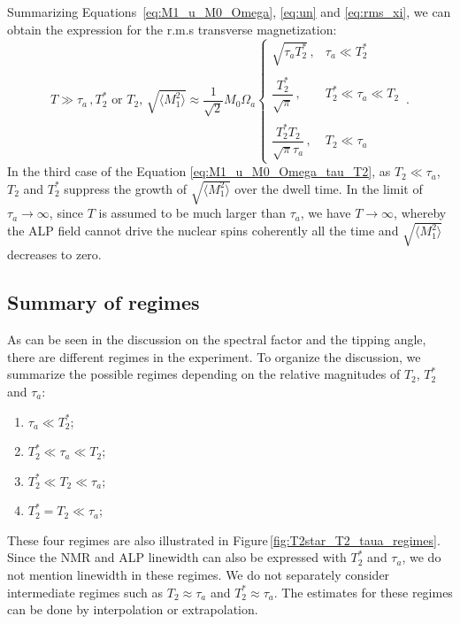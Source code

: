 Summarizing Equations \,\eqref{eq:M1_u_M0_Omega}, \eqref{eq:un} and \eqref{eq:rms_xi}, we can obtain the expression for the r.m.s transverse magnetization:
\begin{equation}
    T\gg\tau_a\,,T_2^*\, \,\text{or}\,\,T_2,\, \sqrt{\langle M_{1}^2 \rangle} \approx \dfrac{1}{\sqrt{2}} M_{0}\Omega_a\left\{
    \begin{array}{cl}
    \sqrt{\tau_a T_2^*}\, ,
    &  \tau_a \ll T_2^*\\
    & \\
    \dfrac{T_2^*}{\sqrt{\pi}}\, ,
    &  T_2^*\ll\tau_a \ll T_2\\
    & \\
     \dfrac{T_2^*T_2}{\sqrt{\pi}\tau_a}\, ,
    &  T_2 \ll \tau_a
    \end{array} \right.
    \,.\label{eq:M1_u_M0_Omega_tau_T2}
\end{equation}
In the third case of the Equation \eqref{eq:M1_u_M0_Omega_tau_T2}, as $T_2 \ll \tau_a$, $T_2$ and $T_2^*$ suppress the growth of $\sqrt{\langle M_{1}^2 \rangle}$ over the dwell time. In the limit of $\tau_a\rightarrow\infty$, since $T$ is assumed to be much larger than $\tau_a$, we have $T\rightarrow\infty$, whereby the ALP field cannot drive the nuclear spins coherently all the time and $\sqrt{\langle M_{1}^2 \rangle}$ decreases to zero. 

\subsection{Summary of regimes}


As can be seen in the discussion on the spectral factor and the tipping angle, there are different regimes in the experiment. 
To organize the discussion, we summarize the possible regimes depending on the relative magnitudes of $T_2$, $T_2^*$ and $\tau_a$: 
\begin{enumerate}[label = (\arabic*)]
    \item $\tau_a \ll T_2^*$;
    \item $T_2^* \ll \tau_a \ll T_2 $;
    \item $T_2^* \ll T_2 \ll \tau_a$;
    \item $T_2^*=T_2 \ll \tau_a$;
\end{enumerate}
These four regimes are also illustrated in Figure\,\ref{fig:T2star_T2_taua_regimes}. Since the NMR and ALP linewidth can also be expressed with $T_2^*$ and $\tau_a$, we do not mention linewidth in these regimes. We do not separately consider intermediate regimes such as $T_2\approx \tau_a$ and $T_2^* \approx \tau_a$. The estimates for these regimes can be done by interpolation or extrapolation. 

